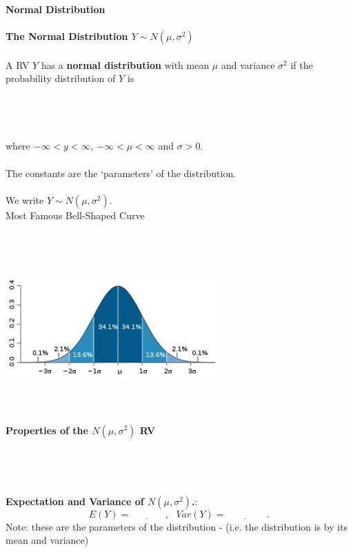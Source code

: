 \pagebreak

\huge \textbf{Normal Distribution}\normalsize\\~\\
\textbf{The Normal Distribution $Y\sim N(\mu,\sigma^2)$}\\~\\
A RV $Y$ has a \textbf{normal distribution} with mean $\mu$ and variance $\sigma^2$ if the probability distribution of $Y$ is\\~\\~\\~\\~\\
where $-\infty < y < \infty$, $-\infty < \mu < \infty$ and $\sigma>0$.\\~\\
The constants  \underbar{~~~~~~~~~~~~~~~~~~~~~~~~~~~~~~~~~~~~~~}  are the `parameters' of the distribution.\\~\\
We write $Y \sim N(\mu, \sigma^2)$.\\
Most Famous Bell-Shaped Curve\\~\\
\begin{center}
\includegraphics[height=2.5in,width=3.2in]{chapter4/normaldistribution.jpg}
\end{center}



\textbf{Properties of the $N(\mu,\sigma^2)$ RV}
\bi
\item  \underbar{~~~~~~~~~~~~~~~~~~~~~~~~~~~~~~~~~~~~~~~~~~~~~~~~~~~~~~~~~~~~~~~~~~~~~~~~~~~~~~~~~~~~~~~} \\
\item  \underbar{~~~~~~~~~~~~~~~~~~~~~~~~~~~~~~~~~~~~~~~~~~~~~~~~~~~~~~~~~~~~~~~~~~~~~~~~~~~~~~~~~~~~~~~} \\
\item  \underbar{~~~~~~~~~~~~~~~~~~~~~~~~~~~~~~~~~~~~~~~~~~~~~~~~~~~~~~~~~~~~~~~~~~~~~~~~~~~~~~~~~~~~~~~} 
\ei
\textbf{Expectation and Variance of $N(\mu,\sigma^2)$.}:\\
$$E(Y) = \underbar{~~~~~~~~~~~~~~~~} , ~~~ Var(Y) = \underbar{~~~~~~~~~~~~~~~~~~~} .$$
Note: these are the parameters of the distribution - (i.e. the distribution is  \underbar{~~~~~~~~~~~~~~~~~~~~~~~~~~~~~~~~~~~~~}  by its mean and variance)

